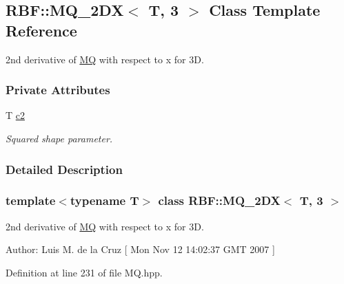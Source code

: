 \hypertarget{classRBF_1_1MQ__2DX_3_01T_00_013_01_4}{
\subsection{RBF::MQ\_\-2DX$<$ T, 3 $>$ Class Template Reference}
\label{classRBF_1_1MQ__2DX_3_01T_00_013_01_4}
}
2nd derivative of \hyperlink{classRBF_1_1MQ}{MQ} with respect to x for 3D.  


\subsubsection*{Private Attributes}
\begin{CompactItemize}
\item 
\hypertarget{classRBF_1_1MQ__2DX_3_01T_00_013_01_4_95705fb6c77f87f1eaca02d198241557}{
T \hyperlink{classRBF_1_1MQ__2DX_3_01T_00_013_01_4_95705fb6c77f87f1eaca02d198241557}{c2}}
\label{classRBF_1_1MQ__2DX_3_01T_00_013_01_4_95705fb6c77f87f1eaca02d198241557}

\begin{CompactList}\small\item\em Squared shape parameter. \item\end{CompactList}\end{CompactItemize}


\subsubsection{Detailed Description}
\subsubsection*{template$<$typename T$>$ class RBF::MQ\_\-2DX$<$ T, 3 $>$}

2nd derivative of \hyperlink{classRBF_1_1MQ}{MQ} with respect to x for 3D. 

\begin{Desc}
\item[Author:]Luis M. de la Cruz \mbox{[} Mon Nov 12 14:02:37 GMT 2007 \mbox{]} \end{Desc}


Definition at line 231 of file MQ.hpp.